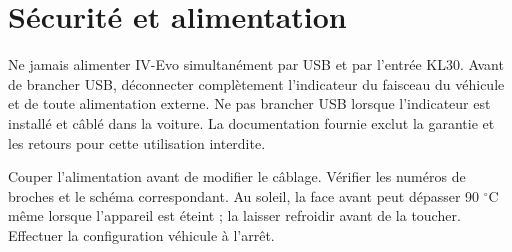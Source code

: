 \chapter{Sécurité et alimentation}
Ne jamais alimenter IV-Evo simultanément par USB et par l'entrée KL30. Avant de brancher USB, déconnecter complètement l'indicateur du faisceau du véhicule et de toute alimentation externe. Ne pas brancher USB lorsque l'indicateur est installé et câblé dans la voiture. La documentation fournie exclut la garantie et les retours pour cette utilisation interdite.

Couper l'alimentation avant de modifier le câblage. Vérifier les numéros de broches et le schéma correspondant. Au soleil, la face avant peut dépasser 90 $^\circ$C même lorsque l'appareil est éteint ; la laisser refroidir avant de la toucher. Effectuer la configuration véhicule à l'arrêt.
